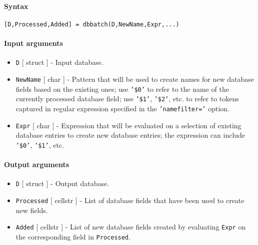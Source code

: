 


	\paragraph{Syntax}\label{syntax}

\begin{verbatim}
[D,Processed,Added] = dbbatch(D,NewName,Expr,...)
\end{verbatim}

\paragraph{Input arguments}\label{input-arguments}

\begin{itemize}
\item
  \texttt{D} {[} struct {]} - Input database.
\item
  \texttt{NewName} {[} char {]} - Pattern that will be used to create
  names for new database fields based on the existing ones; use
  \texttt{'\$0'} to refer to the name of the currently processed
  database field; use \texttt{'\$1'}, \texttt{'\$2'}, etc. to refer to
  tokens captured in regular expression specified in the
  \texttt{'namefilter='} option.
\item
  \texttt{Expr} {[} char {]} - Expression that will be evaluated on a
  selection of existing database entries to create new database entries;
  the expression can include \texttt{'\$0'}, \texttt{'\$1'}, etc.
\end{itemize}

\paragraph{Output arguments}\label{output-arguments}

\begin{itemize}
\item
  \texttt{D} {[} struct {]} - Output database.
\item
  \texttt{Processed} {[} cellstr {]} - List of database fields that have
  been used to create new fields.
\item
  \texttt{Added} {[} cellstr {]} - List of new database fields created
  by evaluating \texttt{Expr} on the corresponding field in
  \texttt{Processed}.
\end{itemize}

